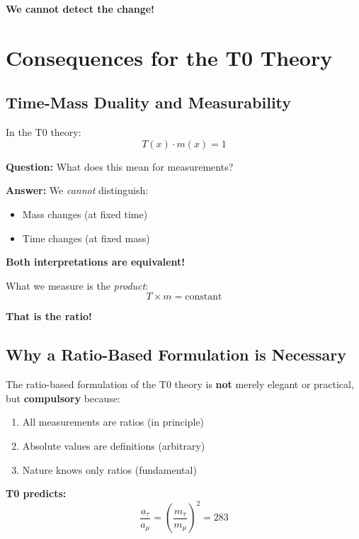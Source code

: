 \textbf{We cannot detect the change!}

\section{Consequences for the T0 Theory}

\subsection{Time-Mass Duality and Measurability}

In the T0 theory:
\begin{equation}
	T(x) \cdot m(x) = 1
\end{equation}

\textbf{Question:} What does this mean for measurements?

\textbf{Answer:} We \textit{cannot} distinguish:
\begin{itemize}[nosep]
	\item Mass changes (at fixed time)
	\item Time changes (at fixed mass)
\end{itemize}

\textbf{Both interpretations are equivalent!}

What we measure is the \textit{product}:
\begin{equation}
	T \times m = \text{constant}
\end{equation}

\textbf{That is the ratio!}

\subsection{Why a Ratio-Based Formulation is Necessary}

The ratio-based formulation of the T0 theory is \textbf{not} merely elegant or practical, but \textbf{compulsory} because:

\begin{enumerate}
	\item All measurements are ratios (in principle)
	\item Absolute values are definitions (arbitrary)
	\item Nature knows only ratios (fundamental)
\end{enumerate}

\textbf{T0 predicts:}
\begin{equation}
	\frac{a_\tau}{a_\mu} = \left(\frac{m_\tau}{m_\mu}\right)^2 = 283
\end{equation}

